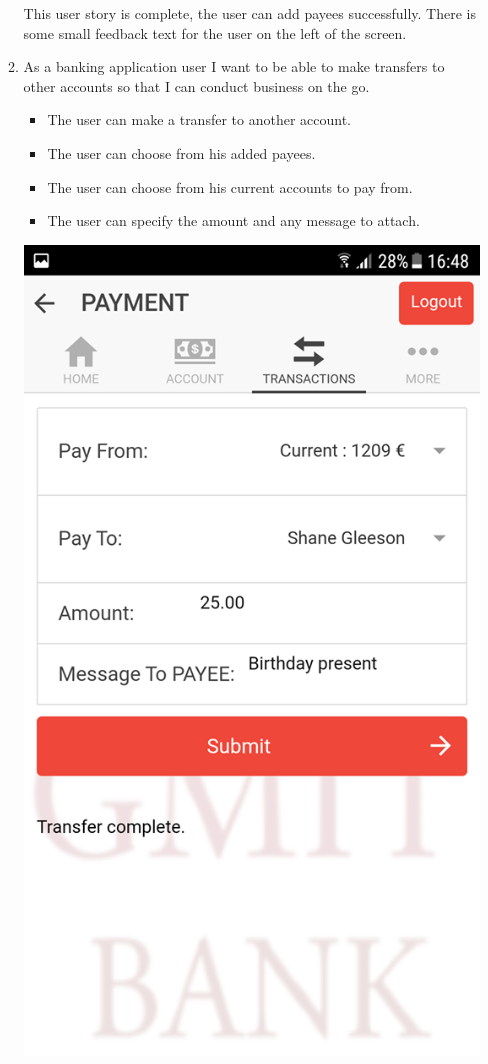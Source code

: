 \begin{itemize}
\begin{enumerate}
\begin{center}
\end{center}
        This user story is complete, the user can add payees successfully. There is some small feedback text for the user on the left of the screen.
        \item As a banking application user I want to be able to make transfers to other accounts so that I can conduct business on the go.
            \begin{itemize}
                \item The user can make a transfer to another account.
                \item The user can choose from his added payees.
                \item The user can choose from his current accounts to pay from.
                \item The user can specify the amount and any message to attach.
            \end{itemize}
\begin{center}
    \includegraphics[scale=0.5]{img/12transfercomplete.png}

\end{center}
\end{enumerate}
\end{itemize}
